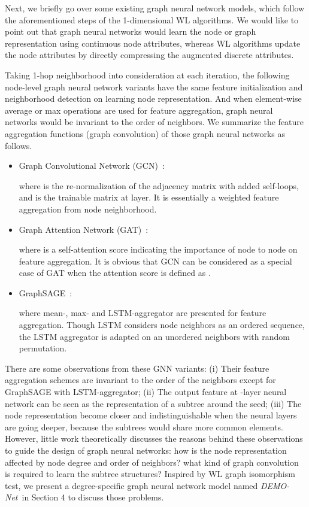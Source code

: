 \documentclass[sigconf]{acmart}
\newcommand{\demonet}{{\emph {DEMO-Net}}}
\begin{document}
Next, we briefly go over some existing graph neural network models, which follow the aforementioned steps of the 1-dimensional WL algorithms. We would like to point out that graph neural networks would learn the node or graph representation using continuous node attributes, whereas WL algorithms update the node attributes by directly compressing the augmented discrete attributes.

Taking 1-hop neighborhood  into consideration at each iteration, the following node-level graph neural network variants have the same feature initialization and neighborhood detection on learning node representation. And when element-wise average or max operations are used for feature aggregation, graph neural networks would be invariant to the order of neighbors. We summarize the feature aggregation functions (graph convolution) of those graph neural networks as follows.

\begin{itemize}
\item Graph Convolutional Network (GCN)~\cite{kipf2016semi}:

where  is the re-normalization of the adjacency matrix  with added self-loops, and  is the trainable matrix at  layer. It is essentially a weighted feature aggregation from node neighborhood.
\item Graph Attention Network (GAT)~\cite{velickovic2017graph}:

where  is a self-attention score indicating the importance of node  to node  on feature aggregation. It is obvious that GCN can be considered as a special case of GAT when the attention score  is defined as .
\item GraphSAGE~\cite{hamilton2017inductive}:

where mean-, max- and LSTM-aggregator are presented for feature aggregation. Though LSTM considers node neighbors as an ordered sequence, the LSTM aggregator is adapted on an unordered neighbors with random permutation.
\end{itemize}

There are some observations from these GNN variants: (i) Their feature aggregation schemes are invariant to the order of the neighbors except for GraphSAGE with LSTM-aggregator; (ii) The output feature at -layer neural network can be seen as the representation of a subtree around the seed; (iii) The node representation become closer and indistinguishable when the neural layers are going deeper, because the subtrees would share more common elements. However, little work theoretically discusses the reasons behind these observations to guide the design of graph neural networks: how is the node representation affected by node degree and order of neighbors? what kind of graph convolution is required to learn the subtree structures? Inspired by WL graph isomorphism test, we present a degree-specific graph neural network model named \demonet\ in Section 4 to discuss those problems.
\end{document}
